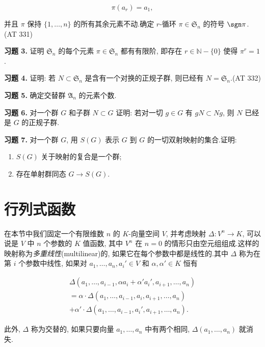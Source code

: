 \[
\pi(a_r) = a_1,
\]

并且 $\pi$ 保持 $\{1, \ldots, n\}$ 的所有其余元素不动.确定 $r$-循环 $\pi \in \mathfrak{S}_n$ 的符号 $\sgn \pi$.(AT 331)

\medskip
\noindent\textbf{习题 3.} 证明 $\mathfrak{S}_n$ 的每个元素 $\pi \in \mathfrak{S}_n$ 都有有限阶, 即存在 $r \in \mathbb{N} - \{0\}$ 使得 $\pi^r = 1$.

\medskip
\noindent\textbf{习题 4.} 证明: 若 $N \subset \mathfrak{S}_n$ 是含有一个对换的正规子群, 则已经有 $N = \mathfrak{S}_n$.(AT 332)

\medskip
\noindent\textbf{习题 5.} 确定交替群 $\mathfrak{A}_n$ 的元素个数.

\medskip
\noindent\textbf{习题 6.} 对一个群 $G$ 和子群 $N \subset G$ 证明: 若对一切 $g \in G$ 有 $gN \subset Ng$, 则 $N$ 已经是 $G$ 的正规子群.

\medskip
\noindent\textbf{习题 7.} 对一个群 $G$, 用 $S(G)$ 表示 $G$ 到 $G$ 的一切双射映射的集合.证明:
\begin{enumerate}
\item[(i)] $S(G)$ 关于映射的复合是一个群;
\item[(ii)] 存在单射群同态 $G \longrightarrow S(G)$.
\end{enumerate}

\section{行列式函数}\label{sec:4.2}

在本节中我们固定一个有限维数 $n$ 的 $K$-向量空间 $V$, 并考虑映射 $\varDelta \colon V^n \longrightarrow K$, 可以说是 $V$ 中 $n$ 个参数的 $K$ 值函数, 其中 $V^n$ 在 $n = 0$ 的情形只由空元组组成.这样的映射称为\emph{多重线性}(\textup{multilinear})的, 如果它在每个参数中都是线性的.其中 $\varDelta$ 称为在第 $i$ 个参数中线性, 如果对 $a_1, \ldots, a_n, a_i' \in V$ 和 $\alpha, \alpha' \in K$ 恒有

\[
\begin{array}{c}
\varDelta(a_1, \ldots, a_{i-1}, \alpha a_i + \alpha' a_i', a_{i+1}, \ldots, a_n) \\
= \alpha \cdot \varDelta(a_1, \ldots, a_{i-1}, a_i, a_{i+1}, \ldots, a_n) \\
+ \alpha' \cdot \varDelta(a_1, \ldots, a_{i-1}, a_i', a_{i+1}, \ldots, a_n).
\end{array}
\]

此外, $\varDelta$ 称为交替的, 如果只要向量 $a_1, \ldots, a_n$ 中有两个相同, $\varDelta(a_1, \ldots, a_n)$ 就消失.

